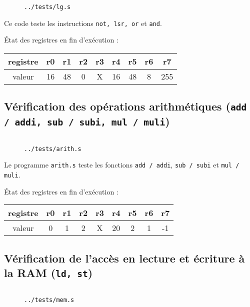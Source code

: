 \documentclass[twoside, 12pt, a4paper]{article}
\newcommand{\fm}[2]{
\begin{figure}[!h]
    \centering
    \inputminted[]{asm}{#1}
    \caption{\texttt{#2}}
\end{figure}
}
\begin{document}
\fm{../tests/lg.s}{../tests/lg.s}

Ce code teste les instructions \texttt{not, lsr, or} et \texttt{and}.

État des registres en fin d'exécution :
\begin{center}
    \ttfamily
        \begin{tabular}{|c|c|c|c|c|c|c|c|c|} 
         \hline
         registre & r0 & r1 & r2 & r3 & r4 & r5 & r6 & r7 \\
         \hline
         valeur   & 16 & 48 &  0 &  X & 16 & 48 & 8  & 255\\
         \hline
    \end{tabular}
\end{center}

\subsection{Vérification des opérations arithmétiques (\texttt{add / addi, sub / subi, mul / muli})}

\fm{../tests/}{../tests/arith.s}

Le programme \texttt{arith.s} teste les fonctions \texttt{add / addi}, \texttt{sub / subi} et \texttt{mul / muli}.

État des registres en fin d'exécution :
\begin{center}
    \ttfamily
        \begin{tabular}{|c|c|c|c|c|c|c|c|c|} 
         \hline
         registre & r0 & r1 & r2 & r3 & r4 & r5 & r6 & r7 \\
         \hline
         valeur   & 0  & 1  & 2  &  X & 20 & 2 &  1  & -1\\
         \hline
    \end{tabular}
\end{center}



\clearpage

\subsection{Vérification de l'accès en lecture et écriture à la RAM (\texttt{ld, st})}

\fm{../tests/mem.s}{../tests/mem.s}
\end{document}
